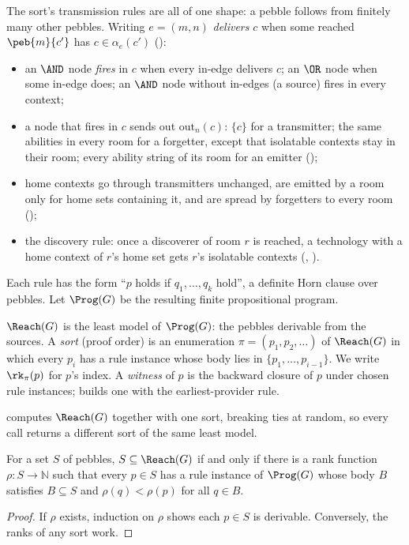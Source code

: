The sort's transmission rules are all of one shape: a pebble follows from finitely many other pebbles. Writing $e=(m,n)$ \emph{delivers} $c$ when some reached $\peb{m}{c'}$ has $c\in\alpha_e(c')$ ():
\begin{itemize}[nosep]
\item an $\AND$ node \emph{fires} in $c$ when every in-edge delivers $c$; an $\OR$ node when some in-edge does; an $\AND$ node without in-edges (a source) fires in every context;
\item a node that fires in $c$ sends out $\mathrm{out}_n(c)$: $\{c\}$ for a transmitter; the same abilities in every room for a forgetter, except that isolatable contexts stay in their room; every ability string of its room for an emitter ();
\item home contexts go through transmitters unchanged, are emitted by a room only for home sets containing it, and are spread by forgetters to every room ();
\item the discovery rule: once a discoverer of room $r$ is reached, a technology with a home context of $r$'s home set gets $r$'s isolatable contexts (, ).
\end{itemize}
Each rule has the form ``$p$ holds if $q_1,\dots,q_k$ hold'', a definite Horn clause over pebbles. Let $\Prog(G)$ be the resulting finite propositional program.

\begin{definition}
$\Reach(G)$ is the least model of $\Prog(G)$: the pebbles derivable from the sources. A \emph{sort} (proof order) is an enumeration $\pi=(p_1,p_2,\dots)$ of $\Reach(G)$ in which every $p_i$ has a rule instance whose body lies in $\{p_1,\dots,p_{i-1}\}$. We write $\rk_\pi(p)$ for $p$'s index. A \emph{witness} of $p$ is the backward closure of $p$ under chosen rule instances;  builds one with the earliest-provider rule.
\end{definition}

 computes $\Reach(G)$ together with one sort, breaking ties at random, so every call returns a different sort of the same least model.

\begin{lemma}[Justification]\label{lem:justification}
For a set $S$ of pebbles, $S\subseteq\Reach(G)$ if and only if there is a rank function $\rho:S\to\mathbb N$ such that every $p\in S$ has a rule instance of $\Prog(G)$ whose body $B$ satisfies $B\subseteq S$ and $\rho(q)<\rho(p)$ for all $q\in B$.
\end{lemma}
\begin{proof}
If $\rho$ exists, induction on $\rho$ shows each $p\in S$ is derivable. Conversely, the ranks of any sort work.
\end{proof}


